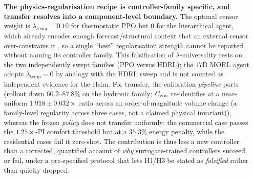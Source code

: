 \textbf{The physics-regularisation recipe is controller-family specific, and transfer resolves into a component-level boundary.} The optimal censor weight is $\lambda_{\mathrm{temp}}=0.10$ for thermostatic PPO but $0$ for the hierarchical agent, which already encodes enough forecast/structural context that an external censor over-constrains it \citep{Liao2025HDRL,Byeon2025MaxMinMORL}, so a single ``best'' regularisation strength cannot be reported without naming its controller family. This falsification of $\lambda$-universality rests on the two independently swept families (PPO versus HDRL); the $17$D MORL agent adopts $\lambda_{\mathrm{temp}}=0$ by analogy with the HDRL sweep and is not counted as independent evidence for the claim. For transfer, the calibration \emph{pipeline} ports (rollout \RMSE{} down $60.2$--$87.8\%$ on the hydronic family; $C_{\mathrm{zon}}$ re-identifies at a near-uniform $1.918\pm0.032\times$ ratio across an order-of-magnitude volume change (a family-level regularity across three cases, not a claimed physical invariant)), whereas the frozen \emph{policy} does not transfer uniformly: the commercial case passes the $1.25\times$-PI comfort threshold but at a $35.3\%$ energy penalty, while the residential cases fail it zero-shot. The contribution is thus less a new controller than a corrected, quantified account of \emph{why} surrogate-trained controllers succeed or fail, under a pre-specified protocol that lets H1/H3 be stated as \emph{falsified} rather than quietly dropped.

